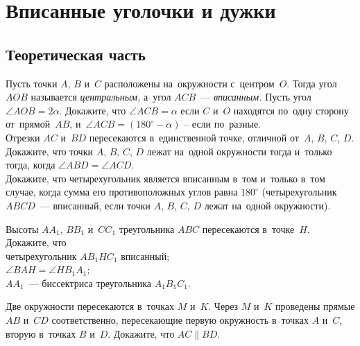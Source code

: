 

\section*{Вписанные уголочки и дужки}


\subsection*{Теоретическая часть}

\begin{problems}
    \makeatletter
        \renewcommand\problem@format[2]{\begingroup\sffamily
            #1.\rlap{\!#2}\endgroup}
        \renewcommand\subproblem@format[2]{\text{\begingroup\sffamily
            #1\rlap{#2}%
            \phantom{#2}%
        .%
        \endgroup}}
    \makeatother
    \small

\subproblem
Пусть точки $A$, $B$ и~$C$ расположены на~окружности с~центром~$O$.
Тогда угол $AOB$ называется \emph{центральным,} а~угол $ACB$~---
\emph{вписанным.}
Пусть угол $\angle AOB = 2 \alpha$.
Докажите, что $\angle ACB = \alpha$ если $C$ и~$O$ находятся по~одну сторону
от~прямой~$AB$, и~$\angle ACB = (180^{\circ} - \alpha)$ -- если по~разные.
\\
\subproblem
Отрезки $AC$ и~$BD$ пересекаются в~единственной точке, отличной
от~$A$, $B$, $C$, $D$.
Докажите, что точки $A$, $B$, $C$, $D$ лежат на~одной окружности тогда и~только
тогда, когда $\angle ABD = \angle ACD$.
\\
\subproblem
Докажите, что четырехугольник является вписанным в~том и~только в~том случае,
когда сумма его противоположных углов равна $180^{\circ}$ (четырехугольник
$ABCD$~--- вписанный, если точки $A$, $B$, $C$, $D$ лежат на~одной окружности).

\item
Высоты $A A_1$, $B B_1$ и~$C C_1$ треугольника $ABC$ пересекаются в~точке~$H$.
Докажите, что
\\
\subproblem четырехугольник $A B_1 H C_1$ вписанный;
\\
\subproblem $\angle BAH = \angle H B_1 A_1$;
\\
\subproblem $A A_1$~--- биссектриса треугольника $A_1 B_1 C_1$.

\item
Две окружности пересекаются в~точках $M$ и~$K$.
Через $M$ и~$K$ проведены прямые $AB$ и~$CD$ соответственно, пересекающие
первую окружность в~точках $A$ и~$C$, вторую в~точках $B$ и~$D$.
Докажите, что $AC \parallel BD$.


\end{problems}

